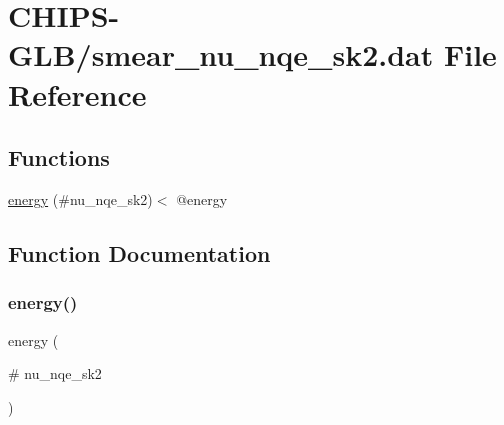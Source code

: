 \hypertarget{smear__nu__nqe__sk2_8dat}{}\section{C\+H\+I\+P\+S-\/\+G\+L\+B/smear\+\_\+nu\+\_\+nqe\+\_\+sk2.dat File Reference}
\label{smear__nu__nqe__sk2_8dat}
\subsection*{Functions}
\begin{DoxyCompactItemize}
\item 
\hyperlink{smear__nu__nqe__sk2_8dat_a5df668d4129be6128c5be036706ff254}{energy} (\#nu\+\_\+nqe\+\_\+sk2)$<$ @energy
\end{DoxyCompactItemize}


\subsection{Function Documentation}
\mbox{\label{smear__nu__nqe__sk2_8dat_a5df668d4129be6128c5be036706ff254}} 
\subsubsection{\texorpdfstring{energy()}{energy()}}
{\footnotesize\ttfamily energy (\begin{DoxyParamCaption}\item[{\#}]{nu\+\_\+nqe\+\_\+sk2 }\end{DoxyParamCaption})}

